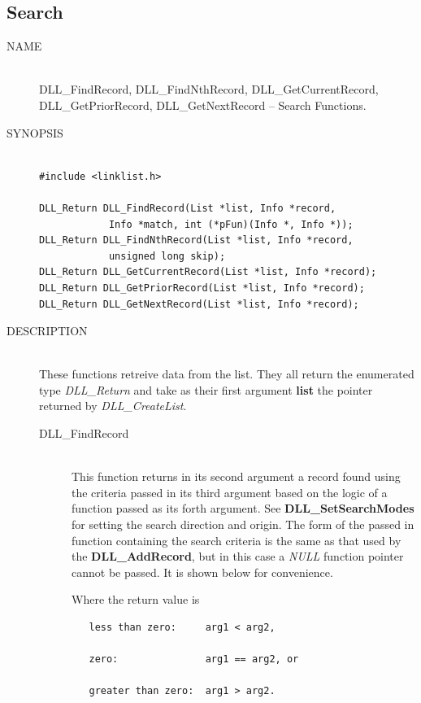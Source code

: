 \documentclass[10pt,letterpaper,titlepage]{article}
\begin{document}
\subsection{Search}
\begin{description}
\item[NAME]\quad\\
DLL\_FindRecord, DLL\_FindNthRecord, DLL\_GetCurrentRecord,\\
DLL\_GetPriorRecord, DLL\_GetNextRecord -- Search Functions.

\item[SYNOPSIS]
\begin{verbatim}

#include <linklist.h>

DLL_Return DLL_FindRecord(List *list, Info *record,
            Info *match, int (*pFun)(Info *, Info *));
DLL_Return DLL_FindNthRecord(List *list, Info *record,
            unsigned long skip);
DLL_Return DLL_GetCurrentRecord(List *list, Info *record);
DLL_Return DLL_GetPriorRecord(List *list, Info *record);
DLL_Return DLL_GetNextRecord(List *list, Info *record);
\end{verbatim}

\item[DESCRIPTION]\quad\\
These functions retreive data from the list.  They all return the enumerated type \emph{DLL\_Return} and take as their first argument \textbf{list} the pointer returned by \emph{DLL\_CreateList}.

 \begin{description}
 \item[DLL\_FindRecord]\quad\\
 This function returns in its second argument a record found using the criteria passed in its third argument based on the logic of a function passed as its forth argument.  See \textbf{DLL\_SetSearchModes} for setting the search direction and origin.  The form of the passed in function containing the search criteria is the same as that used by the \textbf{DLL\_AddRecord}, but in this case a \emph{NULL} function pointer cannot be passed.  It is shown below for convenience.
 \vspace{8pt}

 Where the return value is
 \begin{verbatim}
   less than zero:     arg1 < arg2,

   zero:               arg1 == arg2, or

   greater than zero:  arg1 > arg2.
 \end{verbatim}


\end{description}
\end{description}
\end{document}
